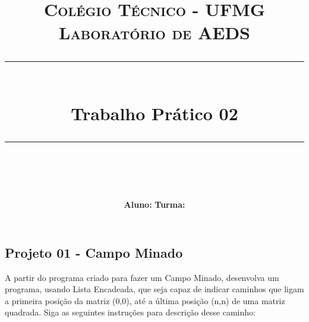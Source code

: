 \documentclass[a4paper]{exam}
\title{
	\normalfont \normalsize 
	\textsc{Colégio Técnico - UFMG \\ 
		Laboratório de AEDS} \\
	\rule{\linewidth}{0.5pt} \\
	\huge Trabalho Prático 02 \\
	\rule{\linewidth}{2pt} \\
}
\author{\textbf{Aluno:} \hspace{10cm} \textbf{Turma:}}
\date{}
\begin{document}
\maketitle

\begin{center}
	\section*{Projeto 01 - Campo Minado}
\end{center}

A partir do programa criado para fazer um Campo Minado, desenvolva um programa, usando Lista Encadeada, que seja capaz de indicar caminhos que ligam a primeira posição da matriz (0,0), até a última posição (n,n) de uma matriz quadrada. Siga as seguintes instruções para descrição desse caminho:
\end{document}
